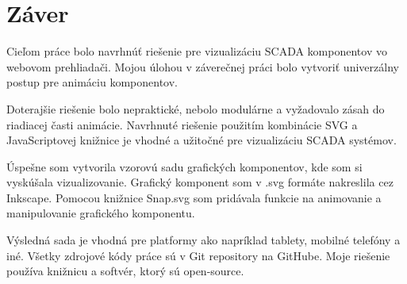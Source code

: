 \chapter*{Záver}

Cieľom práce bolo navrhnúť riešenie pre vizualizáciu SCADA komponentov vo webovom prehliadači. Mojou úlohou v záverečnej práci bolo vytvoriť univerzálny postup pre animáciu komponentov. 

Doterajšie riešenie bolo nepraktické, nebolo  modulárne a vyžadovalo zásah do riadiacej časti animácie. Navrhnuté riešenie použitím kombinácie SVG a JavaScriptovej knižnice je vhodné a užitočné pre vizualizáciu SCADA systémov. 

Úspešne som vytvorila vzorovú sadu grafických komponentov, kde som si vyskúšala vizualizovanie. 
Grafický komponent som v .svg formáte nakreslila cez Inkscape. Pomocou knižnice Snap.svg som pridávala funkcie na animovanie a manipulovanie grafického komponentu. 

Výsledná sada je vhodná pre platformy ako napríklad tablety, mobilné telefóny a iné. 
Všetky zdrojové kódy práce sú v Git repository na GitHube\cite{github}. Moje riešenie používa knižnicu a softvér, ktorý sú open-source.